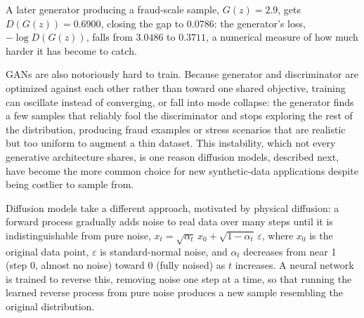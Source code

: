 \documentclass[../ai_in_finance]{subfiles}
\begin{document}
A later generator producing a fraud-scale sample, $G(z) = 2.9$, gets $D(G(z)) = 0.6900$, closing the gap to $0.0786$: the generator's loss, $-\log D(G(z))$, falls from $3.0486$ to $0.3711$, a numerical measure of how much harder it has become to catch.

GANs are also notoriously hard to train. Because generator and discriminator are optimized against each other rather than toward one shared objective, training can oscillate instead of converging, or fall into mode collapse: the generator finds a few samples that reliably fool the discriminator and stops exploring the rest of the distribution, producing fraud examples or stress scenarios that are realistic but too uniform to augment a thin dataset. This instability, which not every generative architecture shares, is one reason diffusion models, described next, have become the more common choice for new synthetic-data applications despite being costlier to sample from.

Diffusion models take a different approach, motivated by physical diffusion: a forward process gradually adds noise to real data over many steps until it is indistinguishable from pure noise, $x_t = \sqrt{\alpha_t}\, x_0 + \sqrt{1-\alpha_t}\,\varepsilon$, where $x_0$ is the original data point, $\varepsilon$ is standard-normal noise, and $\alpha_t$ decreases from near 1 (step 0, almost no noise) toward 0 (fully noised) as $t$ increases. A neural network is trained to reverse this, removing noise one step at a time, so that running the learned reverse process from pure noise produces a new sample resembling the original distribution.

\end{document}
